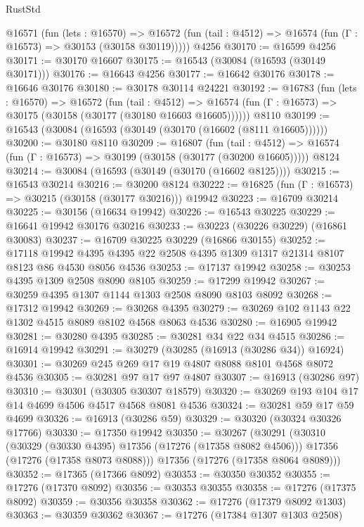 \begin{lexlean}{RustStd}
\begin{coremodule}
    @16571
      (fun (lets : @16570) =>
      @16572 (fun (tail : @4512) => @16574 (fun (Γ : @16573) => @30153 (@30158 @30119)))))
    @4256
@30170 := @16599 @4256
@30171 := @30170 @16607
@30175 := @16543 (@30084 (@16593 (@30149 @30171)))
@30176 := @16643 @4256
@30177 := @16642 @30176
@30178 := @16646 @30176
@30180 := @30178 @30114 @24221
@30192 := @16783
    (fun (lets : @16570) =>
    @16572
      (fun (tail : @4512) =>
      @16574 (fun (Γ : @16573) => @30175 (@30158 (@30177 (@30180 @16603 @16605))))))
    @8110
@30199 := @16543 (@30084 (@16593 (@30149 (@30170 (@16602 (@8111 @16605))))))
@30200 := @30180 @8110
@30209 := @16807
    (fun (tail : @4512) => @16574 (fun (Γ : @16573) => @30199 (@30158 (@30177 (@30200 @16605)))))
    @8124
@30214 := @30084 (@16593 (@30149 (@30170 (@16602 @8125))))
@30215 := @16543 @30214
@30216 := @30200 @8124
@30222 := @16825 (fun (Γ : @16573) => @30215 (@30158 (@30177 @30216))) @19942
@30223 := @16709 @30214
@30225 := @30156 (@16634 @19942)
@30226 := @16543 @30225
@30229 := @16641 @19942 @30176 @30216
@30233 := @30223 (@30226 @30229) (@16861 @30083)
@30237 := @16709 @30225 @30229 (@16866 @30155)
@30252 := @17118
    @19942
    @4395
    @4395
    @22
    @2508
    @4395
    @1309
    @1317
    @21314
    @8107
    @8123
    @86
    @4530
    @8056
    @4536
@30253 := @17137 @19942
@30258 := @30253 @4395 @1309 @2508 @8090 @8105
@30259 := @17299 @19942
@30267 := @30259 @4395 @1307 @1144 @1303 @2508 @8090 @8103 @8092
@30268 := @17312 @19942
@30269 := @30268 @4395
@30279 := @30269 @102 @1143 @22 @1302 @4515 @8089 @8102 @4568 @8063 @4536
@30280 := @16905 @19942
@30281 := @30280 @4395
@30285 := @30281 @34 @22 @34 @4515
@30286 := @16914 @19942
@30291 := @30279 (@30285 (@16913 (@30286 @34)) @16924)
@30301 := @30269 @245 @269 @17 @19 @4807 @8088 @8101 @4568 @8072 @4536
@30305 := @30281 @97 @17 @97 @4807
@30307 := @16913 (@30286 @97)
@30310 := @30301 (@30305 @30307 @18579)
@30320 := @30269 @193 @104 @17 @14 @4699 @4506 @4517 @4568 @8081 @4536
@30324 := @30281 @59 @17 @59 @4699
@30326 := @16913 (@30286 @59)
@30329 := @30320 (@30324 @30326 @17766)
@30330 := @17350 @19942
@30350 := @30267
    (@30291
      (@30310
        (@30329 (@30330 @4395) @17356 (@17276 (@17358 @8082 @4506)))
        @17356
        (@17276 (@17358 @8073 @8088)))
      @17356
      (@17276 (@17358 @8064 @8089)))
@30352 := @17365 (@17366 @8092)
@30353 := @30350 @30352
@30355 := @17276 (@17370 @8092)
@30356 := @30353 @30355
@30358 := @17276 (@17375 @8092)
@30359 := @30356 @30358
@30362 := @17276 (@17379 @8092 @1303)
@30363 := @30359 @30362
@30367 := @17276 (@17384 @1307 @1303 @2508)

\end{coremodule}
\end{lexlean}
